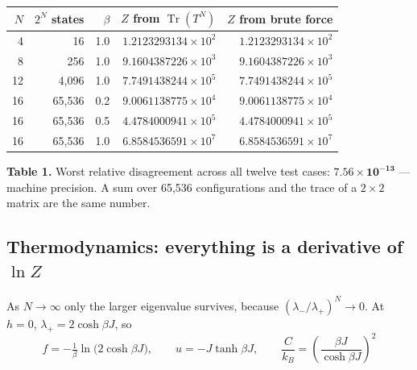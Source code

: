 \begin{center}\small
\begin{tabular}{@{}rrrrr@{}}
\toprule
\rowcolor{ember!13}
\textbf{$N$} & \textbf{$2^N$ states} & \textbf{$\beta$} & \textbf{$Z$ from $\operatorname{Tr}(T^N)$} & \textbf{$Z$ from brute force}\\
\midrule
4  & 16     & 1.0 & $1.2123293134\times10^{2}$ & $1.2123293134\times10^{2}$\\
8  & 256    & 1.0 & $9.1604387226\times10^{3}$ & $9.1604387226\times10^{3}$\\
12 & 4{,}096  & 1.0 & $7.7491438244\times10^{5}$ & $7.7491438244\times10^{5}$\\
16 & 65{,}536 & 0.2 & $9.0061138775\times10^{4}$ & $9.0061138775\times10^{4}$\\
16 & 65{,}536 & 0.5 & $4.4784000941\times10^{5}$ & $4.4784000941\times10^{5}$\\
\rowcolor{ember!7}
16 & 65{,}536 & 1.0 & $6.8584536591\times10^{7}$ & $6.8584536591\times10^{7}$\\
\bottomrule
\end{tabular}
\end{center}
\vspace{-2pt}
\begin{center}\begin{minipage}{0.93\textwidth}\footnotesize\color{slate}
\textbf{Table 1.}\; Worst relative disagreement across all twelve test cases:
$\mathbf{7.56\times10^{-13}}$ --- machine precision. A sum over 65{,}536 configurations and the trace
of a $2\times2$ matrix are the same number.
\end{minipage}\end{center}

\subsection{Thermodynamics: everything is a derivative of \texorpdfstring{$\ln Z$}{ln Z}}

As $N\to\infty$ only the larger eigenvalue survives, because $(\lambda_-/\lambda_+)^N\to0$. At $h=0$,
$\lambda_+=2\cosh\beta J$, so
\[
f=-\tfrac1\beta\ln\!\big(2\cosh\beta J\big),\qquad
u=-J\tanh\beta J,\qquad
\frac{C}{k_B}=\left(\frac{\beta J}{\cosh\beta J}\right)^{2}
\]


